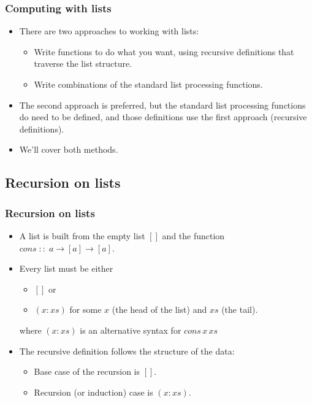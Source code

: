 \documentclass{beamer}
\begin{document}
\begin{frame}[fragile]
\frametitle{Computing with lists}

\begin{itemize}
\item There are two approaches to working with lists:
  \begin{itemize}
  \item Write functions to do what you want, using recursive
    definitions that traverse the list structure.
  \item Write combinations of the standard list processing functions.
  \end{itemize}
\item The second approach is preferred, but the standard
  list processing functions do need to be defined, and those
  definitions use the first approach (recursive definitions).
\item We'll cover both methods.
\end{itemize}

\end{frame}

\subsection{Recursion on lists}

\begin{frame}[fragile]
\frametitle{Recursion on lists}

\begin{itemize}
\item A list is built from the empty list $[]$ and the function $cons\;::\; a\rightarrow [a] \rightarrow [a] $.
\item Every list must be either
  \begin{itemize}
  \item $[]$  or
  \item $(x : xs)$ for some $x$ (the head of the list) and $xs$ (the
    tail).
  \end{itemize}
where  $(x :xs)$ is an alternative syntax for $cons\,x\, xs$
\item The recursive definition follows the structure of the data:
  \begin{itemize}
  \item Base case of the recursion is $[]$.
  \item Recursion (or induction) case is $(x : xs)$.
  \end{itemize}

\end{itemize}

\end{frame}
\end{document}
